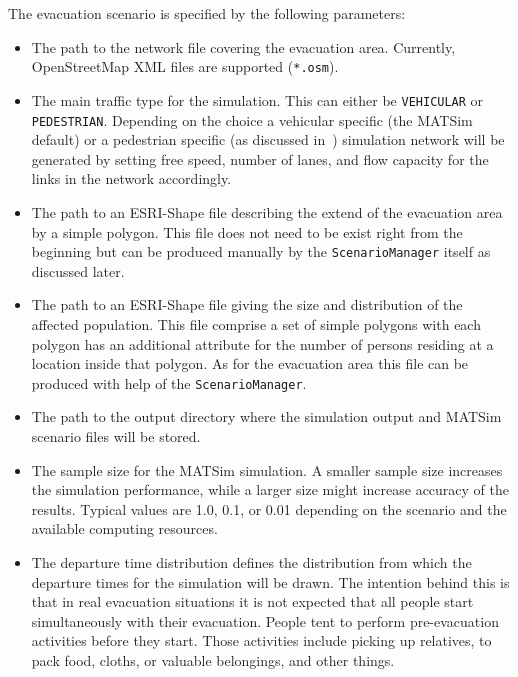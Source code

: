 The evacuation scenario is specified by the following parameters:
\begin{itemize}
\item The path to the network file covering the evacuation area. Currently, OpenStreetMap XML files are supported (\lstinline|*.osm|).
\item The main traffic type for the simulation. This can either be \lstinline|VEHICULAR| or \lstinline|PEDESTRIAN|. Depending on the choice a vehicular specific (the MATSim default) or a pedestrian specific (as discussed in~\citet{LaemmelKluepfelNagel2009EvacPadangAtBookTimmermanns,Laemmel_PhDThesis_2011}) simulation network will be generated by setting free speed, number of lanes, and flow capacity for the links in the network accordingly.
\item The path to an ESRI-Shape file describing the extend of the evacuation area by a simple polygon. This file does not need to be exist right from the beginning but can be produced manually by the \lstinline|ScenarioManager| itself as discussed later.
\item The path to an ESRI-Shape file giving the size and distribution of the affected population. This file comprise a set of simple polygons with each polygon has an additional attribute for the number of persons residing at a location inside that polygon. As for the evacuation area this file can be produced with help of the \lstinline|ScenarioManager|.
\item The path to the output directory where the simulation output and MATSim scenario files will be stored.
\item The sample size for the MATSim simulation. A smaller sample size increases the simulation performance, while a larger size might increase accuracy of the results. Typical values are 1.0, 0.1, or 0.01 depending on the scenario and the available computing resources.
\item The departure time distribution defines the distribution from which the departure times for the simulation will be drawn. The intention behind this is that in real evacuation situations it is not expected that all people start simultaneously with their evacuation. 
People tent to perform pre-evacuation activities before they start. Those activities include picking up relatives, to pack food, cloths, or valuable belongings, and other things. 

\end{itemize}
